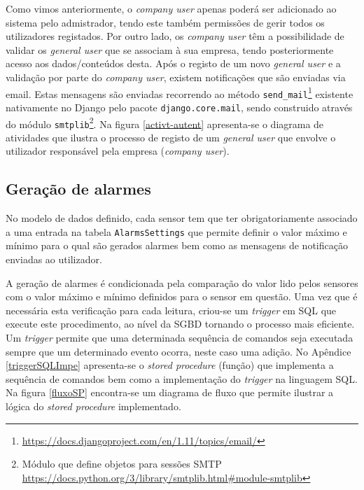 Como vimos anteriormente, o \textit{company user} apenas poderá ser adicionado ao sistema pelo admistrador, tendo este também permissões de gerir todos os utilizadores registados. Por outro lado, os \textit{company user} têm a possibilidade de validar os \textit{general user} que se associam à sua empresa, tendo posteriormente acesso aos dados/conteúdos desta. Após o registo de um novo \textit{general user} e a validação por parte do \textit{company user}, existem notificações que são enviadas via email. Estas mensagens são enviadas recorrendo ao método \texttt{send\_mail}\footnote{\url{https://docs.djangoproject.com/en/1.11/topics/email/}} existente nativamente no Django pelo pacote \texttt{django.core.mail}, sendo construido através do módulo \texttt{smtplib}\footnote{Módulo que define objetos para sessões \ac{SMTP} \url{https://docs.python.org/3/library/smtplib.html\#module-smtplib}}. Na figura \ref{activt-autent} apresenta-se o diagrama de atividades que ilustra o processo de registo de um \textit{general user} que envolve o utilizador responsável pela empresa (\textit{company user}). 








\subsection{Geração de alarmes}

No modelo de dados definido, cada sensor tem que ter obrigatoriamente associado a uma entrada na tabela \texttt{AlarmsSettings} que permite definir o valor máximo e mínimo para o qual são gerados alarmes bem como as mensagens de notificação enviadas ao utilizador. 

A geração de alarmes é condicionada pela comparação do valor lido pelos sensores com o valor máximo e mínimo definidos para o sensor em questão. Uma vez que é necessária esta verificação para cada leitura, criou-se um \textit{trigger} em \ac{SQL} que execute este procedimento, ao nível da \ac{SGBD} tornando o processo mais eficiente. Um \textit{trigger} permite que uma determinada sequência de comandos seja executada sempre que um determinado evento ocorra, neste caso uma adição. No Apêndice \ref{triggerSQLImpe} apresenta-se o \textit{stored procedure} (função) que implementa a sequência de comandos bem como a implementação do \textit{trigger} na linguagem \ac{SQL}. Na figura \ref{fluxoSP} encontra-se um diagrama de fluxo que permite ilustrar a lógica do \textit{stored procedure} implementado. 



